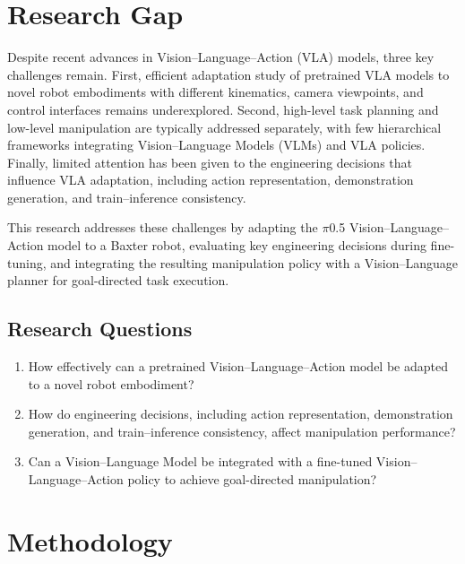 \documentclass[conference, 12pt]{IEEEtran}
\begin{document}

\section{Research Gap}

Despite recent advances in Vision--Language--Action (VLA) models, three key challenges remain. First, efficient adaptation study of pretrained VLA models to novel robot embodiments with different kinematics, camera viewpoints, and control interfaces remains underexplored. Second, high-level task planning and low-level manipulation are typically addressed separately, with few hierarchical frameworks integrating Vision--Language Models (VLMs) and VLA policies. Finally, limited attention has been given to the engineering decisions that influence VLA adaptation, including action representation, demonstration generation, and train--inference consistency.

This research addresses these challenges by adapting the $\pi$0.5 Vision--Language--Action model to a Baxter robot, evaluating key engineering decisions during fine-tuning, and integrating the resulting manipulation policy with a Vision--Language planner for goal-directed task execution.

\subsection{Research Questions}

\begin{enumerate}
    \item How effectively can a pretrained Vision--Language--Action model be adapted to a novel robot embodiment?

    \item How do engineering decisions, including action representation, demonstration generation, and train--inference consistency, affect manipulation performance?

    \item Can a Vision--Language Model be integrated with a fine-tuned Vision--Language--Action policy to achieve goal-directed manipulation?
\end{enumerate}


\section{Methodology}
\end{document}
